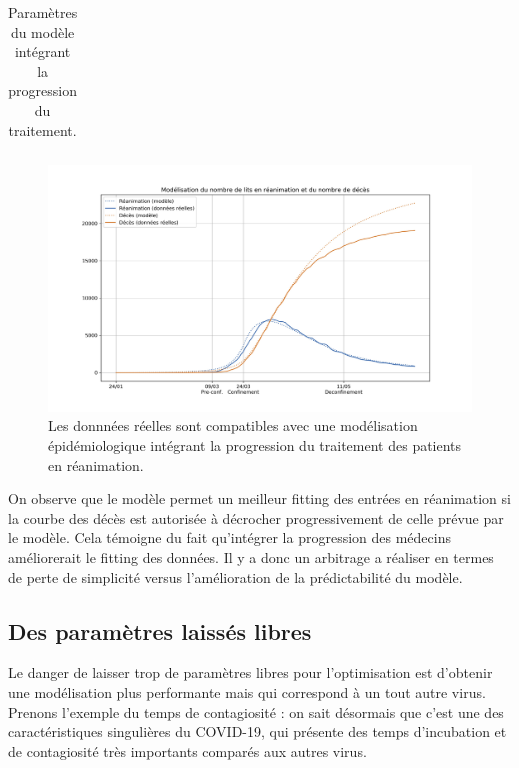 \documentclass[review]{elsarticle}
\begin{document}
\begin{table}
\small
\begin{center}
\begin{tabular}{|c|c|}
    \hline
 
      \hline
\end{tabular}
\end{center}
\caption{Paramètres du modèle intégrant la progression du traitement.}
\label{table:medecins}
\end{table}

\begin{figure}
\begin{center}
\includegraphics[width=1\linewidth]{figures/medecins.jpg}
\end{center}
\caption{Les donnnées réelles sont compatibles avec une modélisation épidémiologique intégrant la progression du traitement des patients en réanimation.}
\label{figure:medecins}
\end{figure}

On observe que le modèle permet un meilleur fitting des entrées en réanimation si la courbe des décès est autorisée à décrocher progressivement de celle prévue par le modèle. Cela témoigne du fait qu'intégrer la progression des médecins améliorerait le fitting des données. Il y a donc un arbitrage a réaliser en termes de perte de simplicité versus l'amélioration de la prédictabilité du modèle.

\subsection{Des paramètres laissés libres}

Le danger de laisser trop de paramètres libres pour l'optimisation est d'obtenir une modélisation plus performante mais qui correspond à un tout autre virus. Prenons l'exemple du temps de contagiosité : on sait désormais que c'est une des caractéristiques singulières du COVID-19, qui présente des temps d'incubation et de contagiosité très importants comparés aux autres virus.
\end{document}

